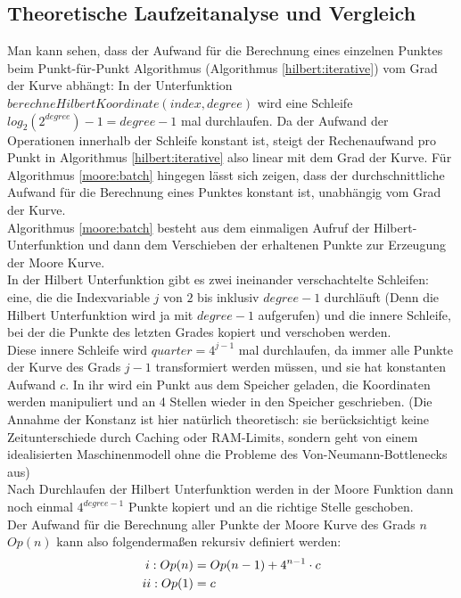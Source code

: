 \documentclass[course=erap]{aspdoc}
\newcommand{\uproman}[1]{\uppercase\expandafter{\romannumeral#1}}
\begin{document}
\subsection{Theoretische Laufzeitanalyse und Vergleich}
Man kann sehen, dass der Aufwand für die Berechnung eines einzelnen Punktes beim Punkt-für-Punkt Algorithmus (Algorithmus \ref{hilbert:iterative}) vom Grad der Kurve abhängt: In der Unterfunktion $berechneHilbertKoordinate(index, degree)$  wird eine Schleife $log_2(2^{degree})-1 = degree -1$ mal durchlaufen. Da der Aufwand der Operationen innerhalb der Schleife konstant ist, steigt der Rechenaufwand pro Punkt in Algorithmus \ref{hilbert:iterative} also linear mit dem Grad der Kurve.
\newline
Für Algorithmus \ref{moore:batch} hingegen lässt sich zeigen, dass der durchschnittliche Aufwand für die Berechnung eines Punktes konstant ist, unabhängig vom Grad der Kurve. \\
Algorithmus \ref{moore:batch} besteht aus dem einmaligen Aufruf der Hilbert-Unterfunktion und dann dem Verschieben der erhaltenen Punkte zur Erzeugung der Moore Kurve. \\
In der Hilbert Unterfunktion gibt es zwei ineinander verschachtelte Schleifen: eine, die die Indexvariable $j$ von $2$ bis inklusiv  $degree -1$ durchläuft (Denn die Hilbert Unterfunktion wird ja mit $degree-1$ aufgerufen) und die innere Schleife, bei der die Punkte des letzten Grades kopiert und verschoben werden. \\ 
Diese innere Schleife wird $quarter = 4^{j-1}$ mal durchlaufen, da immer alle Punkte der Kurve des Grads $j-1$ transformiert werden müssen, und sie hat konstanten Aufwand $c$. In ihr wird ein Punkt aus dem Speicher  geladen, die Koordinaten werden manipuliert und an 4 Stellen wieder in den Speicher geschrieben. (Die Annahme der Konstanz ist hier natürlich theoretisch: sie berücksichtigt keine Zeitunterschiede durch Caching oder RAM-Limits, sondern geht von einem idealisierten Maschinenmodell ohne die Probleme des Von-Neumann-Bottlenecks aus)\\
Nach Durchlaufen der Hilbert Unterfunktion werden in der Moore Funktion dann noch einmal  $4^{degree-1}$ Punkte kopiert und an die richtige Stelle geschoben. \\ Der Aufwand für die Berechnung aller Punkte der Moore Kurve des Grads $n$ $Op(n)$ kann also folgendermaßen rekursiv definiert werden:
\begin{align*}
\uproman{1}: Op(n) &= Op(n-1) + 4^{n-1}\cdot c \\
\uproman{2}: Op(1) &= c
\end{align*}
\end{document}
